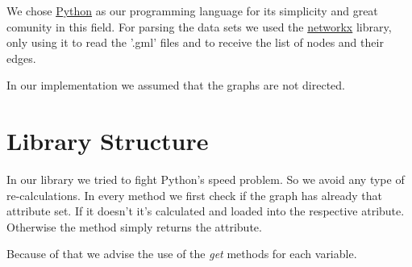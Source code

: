 \documentclass[a4paper,titlepage,11pt]{article}
\begin{document}
We chose \href{https://www.python.org}{Python} as our programming language for its simplicity and great comunity in this field.
For parsing the data sets we used the \href{https://networkx.github.io}{networkx} library, only using it to read the  '.gml' files and to receive the list of nodes and their edges.

In our implementation we assumed that the graphs are not directed.

\section{Library Structure}
In our library we tried to fight Python's speed problem. So we avoid any type of re-calculations.
In every method we first check if the graph has already that attribute set.
If it doesn't it's calculated and loaded into the respective atribute. Otherwise the method simply returns the attribute.

Because of that we advise the use of the \textit{get} methods for each variable.
\end{document}
